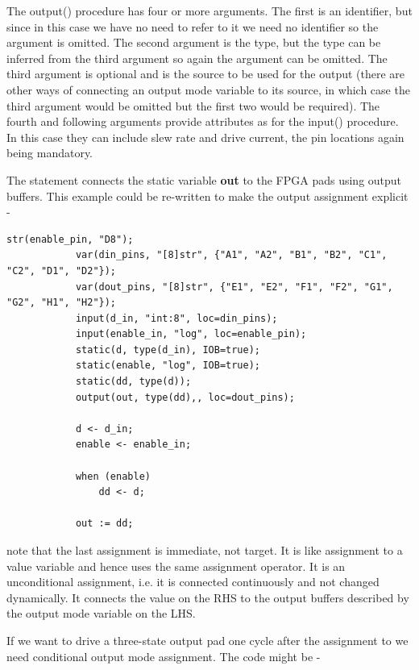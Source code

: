         The output() procedure has four or more arguments. The first is an identifier,
        but since in this case we have no need to refer to it we need no identifier so
        the argument is omitted. The second argument is the type, but the type can be
        inferred from the third argument so again the argument can be omitted. The
        third argument is optional and is the source to be used for the output (there
        are other ways of connecting an output mode variable to its source, in which
        case the third argument would be omitted but the first two would be required).
        The fourth and following arguments provide attributes as for the input()
        procedure. In this case they can include slew rate and drive current, the pin
        locations again being mandatory.

        The  statement connects the static variable {\bf out} to the FPGA
        pads using output buffers. This example could be re-written to make the
        output assignment explicit -

        \begin{lstlisting}[language=threepl]
            str(enable_pin, "D8");
            var(din_pins, "[8]str", {"A1", "A2", "B1", "B2", "C1", "C2", "D1", "D2"});
            var(dout_pins, "[8]str", {"E1", "E2", "F1", "F2", "G1", "G2", "H1", "H2"});
            input(d_in, "int:8", loc=din_pins);
            input(enable_in, "log", loc=enable_pin);
            static(d, type(d_in), IOB=true);
            static(enable, "log", IOB=true);       
            static(dd, type(d));
            output(out, type(dd),, loc=dout_pins);

            d <- d_in;
            enable <- enable_in;

            when (enable)
                dd <- d;

            out := dd;
        \end{lstlisting}

        note that the last assignment is immediate, not target. It is like assignment
        to a value variable and hence uses the same assignment operator. It is
        an unconditional assignment, i.e. it is connected continuously and not
        changed dynamically. It connects
        the value on the RHS to the output buffers described by the output mode
        variable on the LHS.

        If we want to drive a three-state output pad one cycle after the assignment
        to  we need conditional output mode assignment. The code might be -

